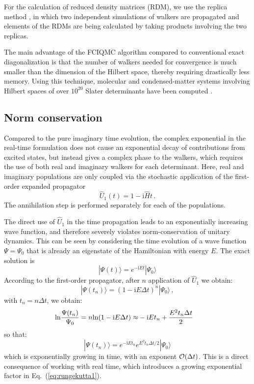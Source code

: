 For the calculation of reduced density matrices (RDM), we use the replica method \cite{OBCA2014}, 
in which two independent simulations of walkers are propagated and elements of
the RDMs are being calculated by taking products 
involving the two replicas.

The main advantage of the FCIQMC algorithm compared to conventional exact diagonalization is that
the number of walkers needed for convergence is much smaller than the
dimension of the Hilbert space, thereby requiring drastically less
memory. Using this technique, molecular and condensed-matter systems involving
Hilbert spaces of over $10^{20}$ Slater determinants have been computed \cite{Daday2012,Shepherd2012}.

\subsection{Norm conservation}
Compared to the pure imaginary time evolution, the complex exponential in the
real-time formulation does not cause an exponential decay of contributions
from excited states, but instead gives a complex phase to the walkers, which
requires the use of both real and imaginary walkers for each determinant. Here, real and
imaginary populations are only coupled via the stochastic application of the
first-order expanded propagator
\begin{equation}
\hat{U}_1(t) = 1 - \mathrm{i}\hat{H}t\,.
\end{equation}
The annihilation step is performed separately for each of the populations.

The direct use of $\hat{U}_1$ in the time propagation leads to an exponentially increasing  
wave function, and therefore severely violates norm-conservation of unitary dynamics. 
This can be seen by considering the time evolution of a wave function $\Psi=\Psi_0$ that is already an eigenstate of the 
Hamiltonian with energy $E$.
The exact solution is 
\begin{equation}
  |\Psi(t)\rangle = e^{-\mathrm{i}Et} |\Psi_0 \rangle   
\end{equation}
According to the first-order propagator, after $n$ application of $\hat{U}_1$
we obtain:
\begin{equation}
|\Psi(t_n)\rangle = (1 - \mathrm{i} E \Delta t)^n |\Psi_0 \rangle  \,,
\end{equation}
with $t_n = n \Delta t$, we obtain:
\begin{eqnarray}\label{eq:rungekutta}
  {\rm ln}{\Psi(t_n)\over \Psi_0}  =  n {\rm ln} (1 - \mathrm{i} E \Delta t) 
   \approx & -\mathrm{i} E t_n + {E^2 t_n  \Delta t\over 2}                              
\end{eqnarray}
so that:
\begin{equation}\label{eq:rungekutta1}
|\Psi(t_n)\rangle = e^{-\mathrm{i} E t_n} e^{E^2 t_n \Delta t/2 } |\Psi_0 \rangle    
\end{equation}
which is exponentially growing in time, with an exponent ${\cal O}(\Delta t)$.                                            
This is a direct consequence of working with real time, which introduces a growing exponential factor 
in Eq.~(\ref{eq:rungekutta1}).

